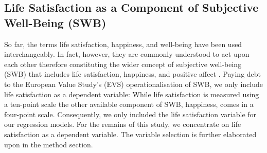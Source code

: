 \documentclass[preprint,12pt,authoryear]{elsarticle}
\begin{document}
\subsection{Life Satisfaction as a Component of Subjective Well-Being (SWB)}
So far, the terms life satisfaction, happiness, and well-being have been used interchangeably. In fact, however, they
are commonly understood to act upon each other therefore constituting the wider concept of subjective well-being (SWB)
that includes life satisfaction, happiness, and positive affect  \citep{bowling_meta-analytic_2010,diener_subjective_1984}. 
Paying debt to the European Value Study’s (EVS) operationalisation of SWB, we only include life satisfaction as a
dependent variable: While life satisfaction is measured using a ten-point scale the other available component of SWB,
happiness, comes in a four-point scale. Consequently, we only included the life satisfaction variable for our regression
models. For the remains of this study, we concentrate on life satisfaction as a dependent variable. The variable selection
is further elaborated upon in the method section. 
\end{document}
